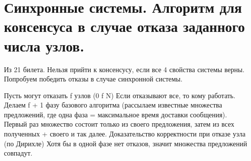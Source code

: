 \section{Синхронные системы. Алгоритм для консенсуса в случае отказа заданного числа узлов.}

Из 21 билета. Нельзя прийти к консенсусу, если все 4 свойства системы верны.
Попробуем победить отказы в случае синхронной системы.

Пусть могут отказать f узлов (0 \leq f \le N) Если отказывают все, то кому работать.
Делаем f + 1 фазу базового алгоритма (рассылаем известные множества предложений, где одна фаза = максимальное время доставки сообщения).
Первый раз множество состоит только из своего предложения, затем из всех полученных + своего и так далее.
Доказательство корректности при отказе узла (по Дирихле)
Хотя бы в одной фазе нет отказов, значит множества предложений совпадут. 
